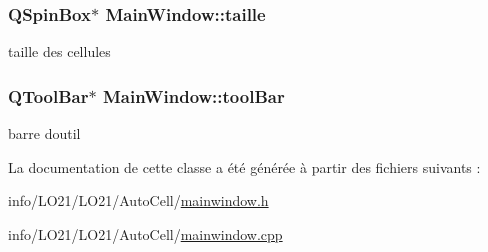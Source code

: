 \subsubsection[{\texorpdfstring{taille}{taille}}]{\setlength{\rightskip}{0pt plus 5cm}Q\+Spin\+Box$\ast$ Main\+Window\+::taille\hspace{0.3cm}{\ttfamily [private]}}\hypertarget{class_main_window_a4ee0dd35b93263abed8d50c2517632e2}{}\label{class_main_window_a4ee0dd35b93263abed8d50c2517632e2}
taille des cellules 
\subsubsection[{\texorpdfstring{tool\+Bar}{toolBar}}]{\setlength{\rightskip}{0pt plus 5cm}Q\+Tool\+Bar$\ast$ Main\+Window\+::tool\+Bar\hspace{0.3cm}{\ttfamily [private]}}\hypertarget{class_main_window_a10d2a8149dc4da0a7df5ee9e4e189721}{}\label{class_main_window_a10d2a8149dc4da0a7df5ee9e4e189721}
barre d\textquotesingle{}outil 

La documentation de cette classe a été générée à partir des fichiers suivants \+:\begin{DoxyCompactItemize}
\item 
info/\+L\+O21/\+L\+O21/\+Auto\+Cell/\hyperlink{mainwindow_8h}{mainwindow.\+h}\item 
info/\+L\+O21/\+L\+O21/\+Auto\+Cell/\hyperlink{mainwindow_8cpp}{mainwindow.\+cpp}\end{DoxyCompactItemize}
